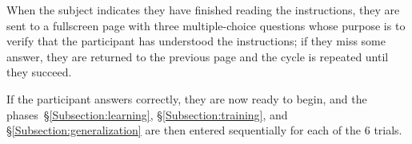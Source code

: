 
When the subject indicates they have finished reading the instructions, they are sent to a fullscreen page with three multiple-choice questions whose purpose is to verify that the participant has understood the instructions; if they miss some answer, they are returned to the previous page and the cycle is repeated until they succeed.

If the participant answers correctly, they are now ready to begin, and the phases~\S\ref{Subsection:learning}, \S\ref{Subsection:training}, and \S\ref{Subsection:generalization} are then entered sequentially for each of the 6 trials.

